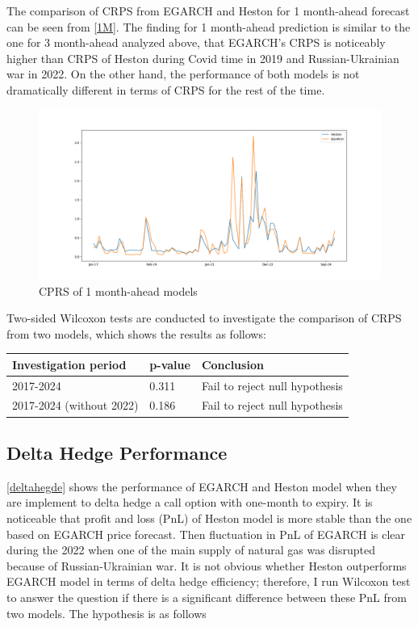 \documentclass[12pt,a4paper]{article}
\newcommand\colorAutoref[1]{{\hypersetup{linkcolor=black}\autoref{#1}}}
\numberwithin{equation}{section}
\begin{document}
The comparison of CRPS from EGARCH and Heston for 1 month-ahead forecast can be seen from \colorAutoref{1M}. The finding for 1 month-ahead prediction is similar to the one for 3 month-ahead analyzed above, that EGARCH's CRPS is noticeably higher than CRPS of Heston during Covid time in 2019 and Russian-Ukrainian war in 2022. On the other hand, the performance of both models is not dramatically different in terms of CRPS for the rest of the time.

\begin{figure}[h!] 
\includegraphics[scale=1,width=1\linewidth,height=0.4\textheight]{onemonthahead.png}
\caption{CPRS of 1 month-ahead models}
\label{1M}
\end{figure}

Two-sided Wilcoxon tests are conducted to investigate the comparison of CRPS from two models, which shows the results as follows:

\begin{table}[h!]
\centering
\begin{tabular}{@{}lll@{}}
\toprule
Investigation period     & p-value & Conclusion                     \\ \midrule
2017-2024                & 0.311    & Fail to reject null hypothesis \\
2017-2024 (without 2022) & 0.186    & Fail to reject null hypothesis \\ \bottomrule
\end{tabular}
\end{table}

\subsection{Delta Hedge Performance}


\colorAutoref{deltahegde} shows the performance of EGARCH and Heston model when they are implement to delta hedge a call option with one-month to expiry. It is noticeable that profit and loss (PnL) of Heston model is more stable than the one based on EGARCH price forecast. Then fluctuation in PnL of EGARCH is clear during the 2022 when one of the main supply of natural gas was disrupted because of Russian-Ukrainian war. It is not obvious whether Heston outperforms EGARCH model in terms of delta hedge efficiency; therefore, I run Wilcoxon test to answer the question if there is a significant difference between these PnL from two models. The hypothesis is as follows
\end{document}
